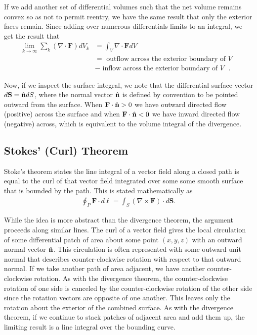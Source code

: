 If we add another set of differential volumes such that the net volume remains convex so as not to permit reentry, we have the same result that only the exterior faces remain. Since adding over numerous differentials limits to an integral, we get the result that 
\begin{align}
  \lim_{k \rightarrow \infty} \sum_k ( \nabla \cdot \mathbf{F} ) dV_k &= \int_V \nabla \cdot \mathbf{F} dV \nonumber \\ 
  &= \text{ outflow across the exterior boundary of $V$ } \nonumber \\ &- \text{ inflow across the exterior boundary of $V$ } .
\end{align}

Now, if we inspect the surface integral, we note that the differential surface vector $d\mathbf{S} = \hat{\mathbf{n}} dS$, where the normal vector $\hat{\mathbf{n}}$ is defined by convention to be pointed outward from the surface. When $\mathbf{F} \cdot \hat{\mathbf{n}} > 0$ we have outward directed flow (positive) across the surface and when $\mathbf{F} \cdot \hat{\mathbf{n}} < 0$ we have inward directed flow (negative) across, which is equivalent to the volume integral of the divergence.


\subsection{Stokes' (Curl) Theorem}

Stoke's theorem states the line integral of a vector field along a closed path is equal to the curl of that vector field integrated over some some smooth surface that is bounded by the path. This is stated mathematically as
\begin{align}
  \oint_P \mathbf{F} \cdot d\boldsymbol\ell = \int_S ( \nabla \times \mathbf{F} ) \cdot d\mathbf{S} .
\end{align}

While the idea is more abstract than the divergence theorem, the argument proceeds along similar lines. The curl of a vector field gives the local circulation of some differential patch of area about some point $(x,y,z)$ with an outward normal vector $\hat{\mathbf{n}}$. This circulation is often represented with some outward unit normal that describes counter-clockwise rotation with respect to that outward normal. If we take another path of area adjacent, we have another counter-clockwise rotation. As with the divergence theorem, the counter-clockwise rotation of one side is canceled by the counter-clockwise rotation of the other side since the rotation vectors are opposite of one another. This leaves only the rotation about the exterior of the combined surface. As with the divergence theorem, if we continue to stack patches of adjacent area and add them up, the limiting result is a line integral over the bounding curve.


